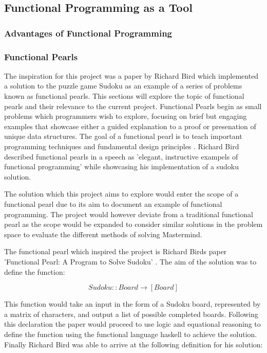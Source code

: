 \documentclass[12pt]{article}  %
\theoremstyle{definition}
\theoremstyle{remark}
\begin{document}

\subsection {Functional Programming as a Tool}

\subsubsection {Advantages of Functional Programming}

\subsubsection {Functional Pearls}
The inspiration for this project was a paper by Richard Bird which implemented a solution to the puzzle game Sudoku as an example of a series of problems known as functional pearls. This sections will explore the topic of functional pearls and their relevance to the current project. Functional Pearls begin as small problems which programmers wish to explore, focusing on brief but engaging examples that showcase either a guided explanation to a proof or presenation of unique data structures. The goal of a functional pearl is to teach important programming techniques and fundamental design principles \cite{Pearls}.  Richard Bird described functional pearls in a speech as 'elegant, instructive exampels of functional programming' while showcasing his implementation of a sudoku solution\cite {R. Bird Speech}.

The solution which this project aims to explore would enter the scope of a functional pearl due to its aim to document an example of functional programming. The project would however deviate from a traditional functional pearl as the scope would be expanded to consider similar solutions in the problem space to evaluate the different methods of solving Mastermind.

The functional pearl which inspired the project is Richard Birds paper 'Functional Pearl: A Program to Solve Sudoku' \cite{Sudoku}. The aim of the solution was to define the function:

\[ Sudoku :: Board \rightarrow [Board]\]

This function would take an input in the form of a Sudoku board, represented by a matrix of characters, and output a list of possible completed boards. Following this declaration the paper would proceed to use logic and equational reasoning to define the function using the functional language haskell to achieve the solution. Finally Richard Bird was able to arrive at the following definition for his solution:
\end{document}
